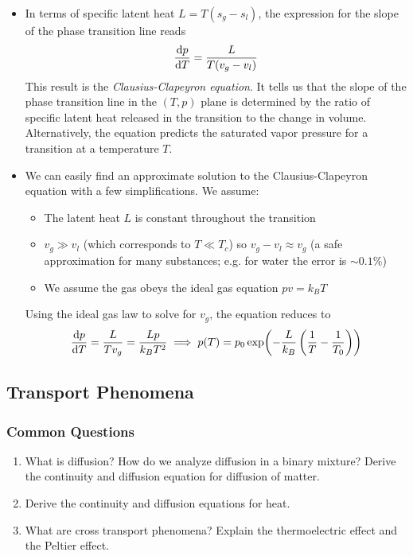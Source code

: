 \documentclass[11pt, a4paper]{article}
\begin{document}
\begin{itemize}
	\item In terms of specific latent heat $ L = T(s_{g} - s_{l}) $, the expression for the slope of the phase transition line reads
	\begin{equation*}
		\dv{p}{T} = \frac{L}{T(v_{g} - v_{l})}
	\end{equation*}
	This result is the \textit{Clausius-Clapeyron equation}. It tells us that the slope of the phase transition line in the $ (T, p) $ plane is determined by the ratio of specific latent heat released in the transition to the change in volume. Alternatively, the equation predicts the saturated vapor pressure for a transition at a temperature $ T $.
	
	\item We can easily find an approximate solution to the Clausius-Clapeyron equation with a few simplifications. We assume:
	\begin{itemize}
		\item The latent heat $ L $ is constant throughout the transition
		\item $ v_{g} \gg v_{l} $ (which corresponds to $ T \ll T_{c} $) so $ v_{g} - v_{l} \approx v_{g}$ (a safe approximation for many substances; e.g. for water the error is $ \sim 0.1 \% $)
		\item We assume the gas obeys the ideal gas equation $ pv = k_{B}T $
	\end{itemize}
	Using the ideal gas law to solve for $ v_{g} $, the equation reduces to
	\begin{equation*}
		\dv{p}{T} = \frac{L}{Tv_{g}} = \frac{Lp}{k_{B}T^{2}} \implies p(T) = p_{0} \exp(-\frac{L}{k_{B}}\left(\frac{1}{T}-\frac{1}{T_{0}}\right))
	\end{equation*}
\end{itemize}



\subsection{Transport Phenomena}

\subsubsection{Common Questions}
\begin{enumerate}
    \item What is diffusion? How do we analyze diffusion in a binary mixture? Derive the continuity and diffusion equation for diffusion of matter.

    \item Derive the continuity and diffusion equations for heat.

    \item What are cross transport phenomena? Explain the thermoelectric effect and the Peltier effect.

\end{enumerate}
\end{document}
